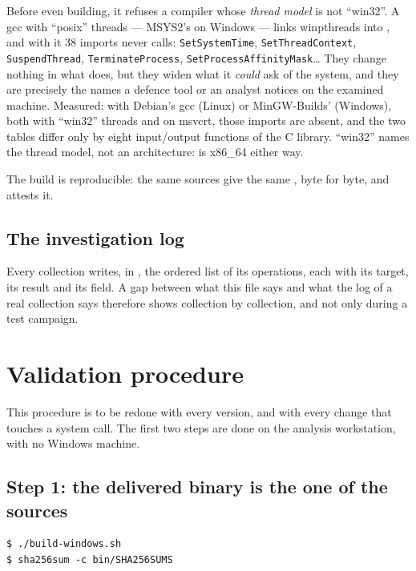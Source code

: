 \documentclass[11pt,a4paper,oneside]{report}
\begin{document}
Before even building, it refuses a compiler whose \emph{thread model} is not
``win32''. A gcc with ``posix'' threads — MSYS2's on Windows — links
winpthreads into , and with it 38 imports \wac{} never
calls: \texttt{SetSystemTime}, \texttt{SetThreadContext},
\texttt{SuspendThread}, \texttt{TerminateProcess},
\texttt{SetProcessAffinityMask}\ldots{} They change nothing in what \wac{}
does, but they widen what it \emph{could} ask of the system, and they are
precisely the names a defence tool or an analyst notices on the examined
machine. Measured: with Debian's gcc (Linux) or MinGW-Builds' (Windows), both
with ``win32'' threads and on msvcrt, those imports are absent, and the two
tables differ only by eight input/output functions of the C library.
``win32'' names the thread model, not an architecture:  is
x86\_64 either way.

The build is reproducible: the same sources give the same ,
byte for byte, and  attests it.

\section{The investigation log}

Every collection writes, in , the ordered list of
its operations, each with its target, its result and its 
field. A gap between what this file says and what the log of a real
collection says therefore shows collection by collection, and not only during
a test campaign.

\chapter{Validation procedure}\label{ch:procedure}

This procedure is to be redone with every version, and with every change that
touches a system call. The first two steps are done on the analysis
workstation, with no Windows machine.

\section{Step 1: the delivered binary is the one of the sources}

\begin{lstlisting}
$ ./build-windows.sh
$ sha256sum -c bin/SHA256SUMS
\end{lstlisting}
\end{document}

